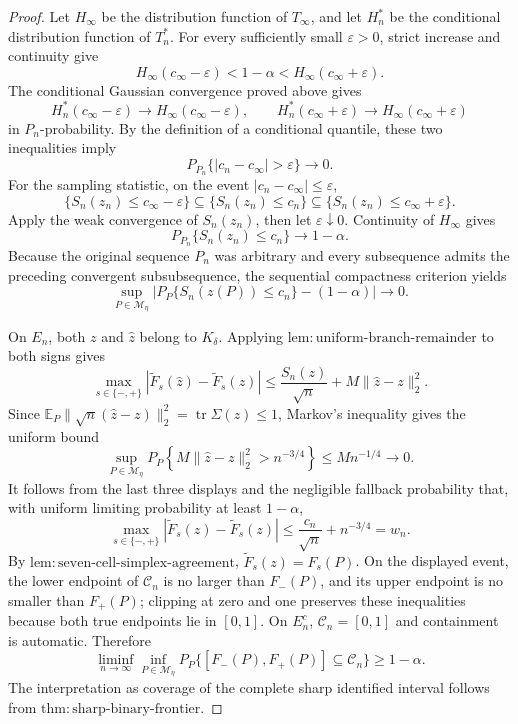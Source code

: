\documentclass{article}
\begin{document}
\begin{proof}
Let \(H_\infty\) be the distribution function of \(T_\infty\), and let \(H_n^*\) be the conditional distribution function of \(T_n^*\).  For every sufficiently small \(\varepsilon>0\), strict increase and continuity give
\[
 H_\infty(c_\infty-\varepsilon)<1-\alpha
 <H_\infty(c_\infty+\varepsilon).
\]
The conditional Gaussian convergence proved above gives
\[
 H_n^*(c_\infty-\varepsilon)\to
 H_\infty(c_\infty-\varepsilon),
 \qquad
 H_n^*(c_\infty+\varepsilon)\to
 H_\infty(c_\infty+\varepsilon)
\]
in \(P_n\)-probability.  By the definition of a conditional quantile, these two inequalities imply
\[
 P_{P_n}\{|c_n-c_\infty|>\varepsilon\}\longrightarrow0.
\]
For the sampling statistic, on the event \(|c_n-c_\infty|\leq\varepsilon\),
\[
 \{S_n(z_n)\leq c_\infty-\varepsilon\}
 \subseteq\{S_n(z_n)\leq c_n\}
 \subseteq\{S_n(z_n)\leq c_\infty+\varepsilon\}.
\]
Apply the weak convergence of \(S_n(z_n)\), then let \(\varepsilon\downarrow0\).  Continuity of \(H_\infty\) gives
\[
P_{P_n}\{S_n(z_n)\leq c_n\}\longrightarrow1-\alpha.
\]
Because the original sequence \(P_n\) was arbitrary and every subsequence admits the preceding convergent subsubsequence, the sequential compactness criterion yields
\[
 \sup_{P\in\mathcal M_\eta}
 \left|P_P\{S_n(z(P))\leq c_n\}-(1-\alpha)\right|
 \longrightarrow0.
\]

On \(E_n\), both \(z\) and \(\widehat z\) belong to \(K_\delta\).  Applying \(\mathrm{lem{:}uniform\text{-}branch\text{-}remainder}\) to both signs gives
\[
 \max_{s\in\{-,+\}}
 \left|\widetilde F_s(\widehat z)-\widetilde F_s(z)\right|
 \leq\frac{S_n(z)}{\sqrt n}+M\|\widehat z-z\|_2^2.
\]
Since \(\mathbb E_P\|\sqrt n(\widehat z-z)\|_2^2=\operatorname{tr}\Sigma(z)\leq1\), Markov's inequality gives the uniform bound
\[
 \sup_{P\in\mathcal M_\eta}
 P_P\!\left\{M\|\widehat z-z\|_2^2>n^{-3/4}\right\}
 \leq M n^{-1/4}\longrightarrow0.
\]
It follows from the last three displays and the negligible fallback probability that, with uniform limiting probability at least \(1-\alpha\),
\[
 \max_{s\in\{-,+\}}
 \left|\widetilde F_s(\widehat z)-\widetilde F_s(z)\right|
 \leq \frac{c_n}{\sqrt n}+n^{-3/4}=w_n.
\]
By \(\mathrm{lem{:}seven\text{-}cell\text{-}simplex\text{-}agreement}\), \(\widetilde F_s(z)=F_s(P)\).  On the displayed event, the lower endpoint of \(\mathcal C_n\) is no larger than \(F_-(P)\), and its upper endpoint is no smaller than \(F_+(P)\); clipping at zero and one preserves these inequalities because both true endpoints lie in \([0,1]\).  On \(E_n^c\), \(\mathcal C_n=[0,1]\) and containment is automatic.  Therefore
\[
 \liminf_{n\to\infty}\inf_{P\in\mathcal M_\eta}
 P_P\{[F_-(P),F_+(P)]\subseteq\mathcal C_n\}
 \geq1-\alpha.
\]
The interpretation as coverage of the complete sharp identified interval follows from \(\mathrm{thm{:}sharp\text{-}binary\text{-}frontier}\).


\end{proof}
\end{document}
